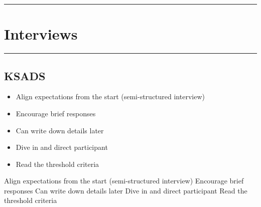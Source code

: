 \documentclass[]{book}
\providecommand{\tightlist}{%
  \setlength{\itemsep}{0pt}\setlength{\parskip}{0pt}}
\begin{document}
\begin{center}\rule{0.5\linewidth}{\linethickness}\end{center}

\hypertarget{interviews}{%
\section{Interviews}\label{interviews}}

\begin{center}\rule{0.5\linewidth}{\linethickness}\end{center}

\hypertarget{ksads}{%
\subsection{KSADS}\label{ksads}}

\begin{itemize}
\tightlist
\item
  Align expectations from the start (semi-structured interview)
\item
  Encourage brief responses
\item
  Can write down details later
\item
  Dive in and direct participant
\item
  Read the threshold criteria
\end{itemize}

Align expectations from the start (semi-structured interview)
Encourage brief responses
Can write down details later
Dive in and direct participant
Read the threshold criteria


\end{document}
